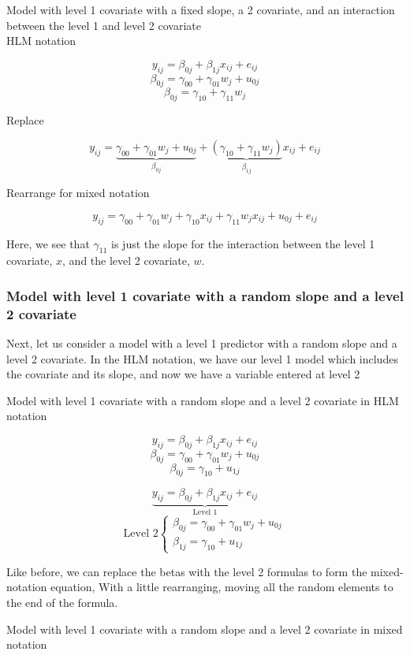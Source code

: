 Model with level 1 covariate with a fixed slope, a 2 covariate, and an interaction between the level 1 and level 2 covariate \\

HLM notation

\[
y_{ij} = \beta_{0j}+\beta_{1j}x_{ij}+e_{ij}
\]
\[
\beta_{0j} = \gamma_{00}+\gamma_{01}w_j+u_{0j}
\]
\[
\beta_{0j} = \gamma_{10}+\gamma_{11}w_j
\]

Replace

\[
y_{ij} = \underbrace{\gamma_{00}+\gamma_{01}w_j+u_{0j}}_{\beta_{0j}}+\underbrace{\left(\gamma_{10}+\gamma_{11}w_j\right)}_{\beta_{1j}}x_{ij}+e_{ij}
\]

Rearrange for mixed notation

\[
y_{ij} = \gamma_{00} + \gamma_{01}w_j + \gamma_{10}x_{ij}+\gamma_{11}w_jx_{ij}+u_{0j}+e_{ij}
\]

Here, we see that $\gamma_{11}$ is just the slope for the interaction between the level 1 covariate, $x$, and the level 2 covariate, $w$.

\subsubsection{Model with level 1 covariate with a random slope and a level 2 covariate}

Next, let us consider a model with a level 1 predictor with a random slope and a level 2 covariate. In the HLM notation, we have our level 1 model which includes the covariate and its slope, and now we have a variable entered at level 2

Model with level 1 covariate with a random slope and a level 2 covariate in HLM notation

\[
y_{ij} = \beta_{0j}+\beta_{1j}x_{ij}+e_{ij}
\]
\[
\beta_{0j} = \gamma_{00}+\gamma_{01}w_j+u_{0j}
\]
\[
\beta_{0j} = \gamma_{10}+u_{1j}
\]

\[
\underbrace{y_{ij} = \beta_{0j}+\beta_{1j}x_{ij}+e_{ij}}_{\text{Level 1}}
\]
\[
\mbox{Level 2}
\begin{cases}
    \beta_{0j} = \gamma_{00}+\gamma_{01}w_j+u_{0j}  \\
    \beta_{1j} = \gamma_{10}+u_{1j}
\end{cases}
\]


Like before, we can replace the betas with the level 2 formulas to form the mixed-notation equation, With a little rearranging, moving all the random elements to the end of the formula.

Model with level 1 covariate with a random slope and a level 2 covariate in mixed notation

